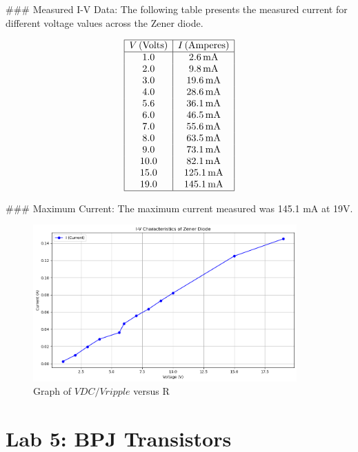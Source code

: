 \documentclass{article}
\begin{document}
### Measured I-V Data:
The following table presents the measured current for different voltage values across the Zener diode.

\[
\begin{array}{|c|c|}
\hline
V \, (\text{Volts}) & I \, (\text{Amperes}) \\
\hline
1.0 & 2.6 \, \text{mA} \\
2.0 & 9.8 \, \text{mA} \\
3.0 & 19.6 \, \text{mA} \\
4.0 & 28.6 \, \text{mA} \\
5.6 & 36.1 \, \text{mA} \\
6.0 & 46.5 \, \text{mA} \\
7.0 & 55.6 \, \text{mA} \\
8.0 & 63.5 \, \text{mA} \\
9.0 & 73.1 \, \text{mA} \\
10.0 & 82.1 \, \text{mA} \\
15.0 & 125.1 \, \text{mA} \\
19.0 & 145.1 \, \text{mA} \\
\hline
\end{array}
\]

### Maximum Current:
The maximum current measured was 145.1 mA at 19V.

\begin{figure}[H]
    \centering
    \includegraphics[width=0.9\textwidth]{./img/Lab4_6.png}
    \caption{Graph of \( VDC/Vripple \) versus R}
    \label{fig:graph15} 
\end{figure}


\section*{Lab 5: BPJ Transistors}
\end{document}
